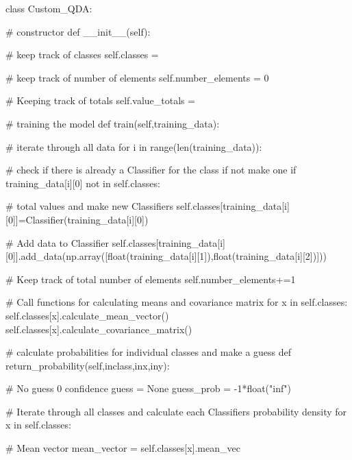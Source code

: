 \documentclass{article}
\begin{document}
\begin{flushleft}
\begin{python}
class Custom_QDA:

        # constructor
        def __init__(self):
        
                # keep track of classes
                self.classes = {}
        
                # keep track of number of elements
                self.number_elements = 0
        
                # Keeping track of totals
                self.value_totals = {}
        
        # training the model
        def train(self,training_data):
                
                # iterate through all data
                for i in range(len(training_data)):
                
                        # check if there is already a Classifier for the class if not make one
                        if training_data[i][0] not in self.classes:

                                # total values and make new Classifiers
                                self.classes[training_data[i][0]]=Classifier(training_data[i][0])
                        
                        # Add data to Classifier
                        self.classes[training_data[i][0]].add_data(np.array([float(training_data[i][1]),float(training_data[i][2])]))
                
                        # Keep track of total number of elements
                        self.number_elements+=1
                
                        # Call functions for calculating means and covariance matrix
                for x in self.classes:
                        self.classes[x].calculate_mean_vector()
                        self.classes[x].calculate_covariance_matrix()
        
        # calculate probabilities for individual classes and make a guess
        def return_probability(self,inclass,inx,iny):
                
                # No guess 0 confidence
                guess = None
                guess_prob = -1*float("inf")
                
                # Iterate through all classes and calculate each Classifiers probability density
                for x in self.classes:
                
                        # Mean vector            
                        mean_vector = self.classes[x].mean_vec
                

\end{python}
\end{flushleft}
\end{document}
